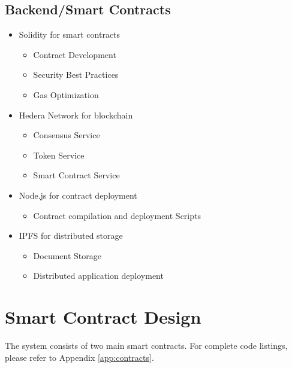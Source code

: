 \documentclass[12pt,a4paper]{article}
\begin{document}
    \subsection{Backend/Smart Contracts}
    \begin{itemize}
        \item Solidity for smart contracts
        \begin{itemize}
            \item Contract Development
            \item Security Best Practices
            \item Gas Optimization
        \end{itemize}

        \item Hedera Network for blockchain
        \begin{itemize}
            \item Consensus Service
            \item Token Service
            \item Smart Contract Service
        \end{itemize}

        \item Node.js for contract deployment
        \begin{itemize}
            \item Contract compilation and deployment Scripts
        \end{itemize}

        \item IPFS for distributed storage
        \begin{itemize}
            \item Document Storage
            \item Distributed application deployment
        \end{itemize}
    \end{itemize}


    \section{Smart Contract Design}
    The system consists of two main smart contracts. For complete code listings, please refer to Appendix \ref{app:contracts}.
\end{document}
